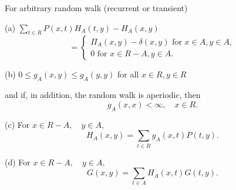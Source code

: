 For arbitrary random walk (recurrent or transient)

(a) $\sum_{t \in R} P(x,t)H_A(t,y) - H_A(x,y)$
$$= \begin{cases} \Pi_A(x,y) - \delta(x,y) \text{ for } x \in A, y \in A, \\ 0 \text{ for } x \in R - A, y \in A. \end{cases}$$

(b) $0 \leq g_A(x,y) \leq g_A(y,y)$ for all $x \in R, y \in R$

and if, in addition, the random walk is aperiodic, then
$$g_A(x,x) < \infty, \quad x \in R.$$

(c) For $x \in R - A, \quad y \in A,$
$$H_A(x,y) = \sum_{t \in R} g_A(x,t)P(t,y).$$

(d) For $x \in R - A, \quad y \in A,$
$$G(x,y) = \sum_{t \in A} H_A(x,t)G(t,y).$$